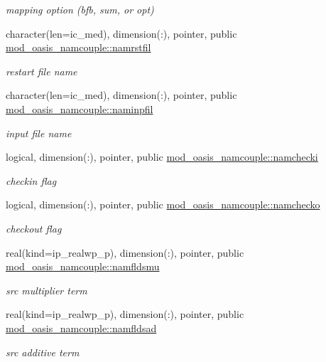 \begin{DoxyCompactItemize}
\begin{DoxyCompactList}\small\item\em mapping option (bfb, sum, or opt) \end{DoxyCompactList}\item 
character(len=ic\+\_\+med), dimension(\+:), pointer, public \hyperlink{namespacemod__oasis__namcouple_a54f4b8262f809a20928092782bc78345}{mod\+\_\+oasis\+\_\+namcouple\+::namrstfil}
\begin{DoxyCompactList}\small\item\em restart file name \end{DoxyCompactList}\item 
character(len=ic\+\_\+med), dimension(\+:), pointer, public \hyperlink{namespacemod__oasis__namcouple_a15fc11ff1c1d5718ff127a06a205a82c}{mod\+\_\+oasis\+\_\+namcouple\+::naminpfil}
\begin{DoxyCompactList}\small\item\em input file name \end{DoxyCompactList}\item 
logical, dimension(\+:), pointer, public \hyperlink{namespacemod__oasis__namcouple_a7c88a329c97aea020e9b135bdca8d160}{mod\+\_\+oasis\+\_\+namcouple\+::namchecki}
\begin{DoxyCompactList}\small\item\em checkin flag \end{DoxyCompactList}\item 
logical, dimension(\+:), pointer, public \hyperlink{namespacemod__oasis__namcouple_a58c011820e55c9af9f306fbb1d45eb23}{mod\+\_\+oasis\+\_\+namcouple\+::namchecko}
\begin{DoxyCompactList}\small\item\em checkout flag \end{DoxyCompactList}\item 
real(kind=ip\+\_\+realwp\+\_\+p), dimension(\+:), pointer, public \hyperlink{namespacemod__oasis__namcouple_ab52824ec91491253e02556a68ab31b09}{mod\+\_\+oasis\+\_\+namcouple\+::namfldsmu}
\begin{DoxyCompactList}\small\item\em src multiplier term \end{DoxyCompactList}\item 
real(kind=ip\+\_\+realwp\+\_\+p), dimension(\+:), pointer, public \hyperlink{namespacemod__oasis__namcouple_a1729dba99742412a1e07a479cb7f7921}{mod\+\_\+oasis\+\_\+namcouple\+::namfldsad}
\begin{DoxyCompactList}\small\item\em src additive term \end{DoxyCompactList}\item 

\end{DoxyCompactItemize}
